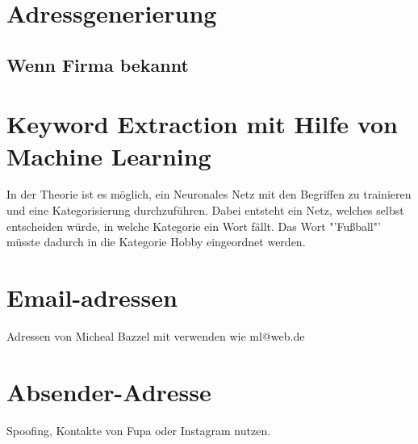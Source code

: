 \section{Adressgenerierung}
	\subsection{Wenn Firma bekannt}
\section{Keyword Extraction mit Hilfe von Machine Learning}
\label{sec:KeywordExtractionMachine Learning}
In der Theorie ist es möglich, ein Neuronales Netz mit den Begriffen zu trainieren und eine Kategorisierung durchzuführen. Dabei entsteht ein Netz, welches selbst entscheiden würde, in welche Kategorie ein Wort fällt. Das Wort "'Fußball"' müsste dadurch in die Kategorie Hobby eingeordnet werden.

\section{Email-adressen}
Adressen von Micheal Bazzel mit verwenden wie ml@web.de

\section{Absender-Adresse}
Spoofing, Kontakte von Fupa oder Instagram nutzen.


